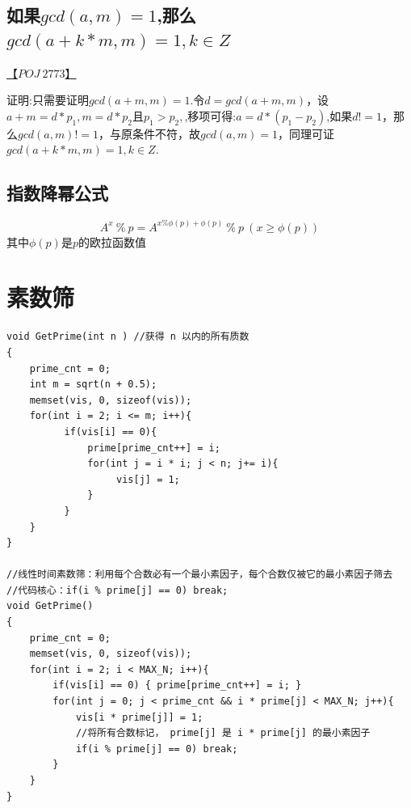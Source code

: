 \subsection{如果$gcd(a,m)=1$,那么$gcd(a+k*m,m)=1,k\in Z$}
\underline{【$POJ\ 2773$】}

证明:只需要证明$gcd(a+m, m)=1$.令$d=gcd(a+m,m)$，设$a+m=d*p_1,m=d*p_2且p_1>p_2,$,移项可得:$a=d*(p_1-p_2)$,如果$d!=1$，那么$gcd(a,m)!=1$，与原条件不符，故$gcd(a,m)=1$，同理可证$gcd(a+k*m,m)=1,k\in Z$.

\subsection{指数降幂公式}
$$A^{x}\ \% \ p=A^{x\%\phi(p)+\phi(p)}\  \% \ p\ (x\geq \phi(p))$$
其中$\phi(p)$是$p$的欧拉函数值

\clearpage
\section{素数筛}

\begin{lstlisting}
void GetPrime(int n ) //获得 n 以内的所有质数
{
    prime_cnt = 0;
    int m = sqrt(n + 0.5);
    memset(vis, 0, sizeof(vis));
    for(int i = 2; i <= m; i++){
          if(vis[i] == 0){
              prime[prime_cnt++] = i;
              for(int j = i * i; j < n; j+= i){
                   vis[j] = 1;
              }
          }
    }
}

//线性时间素数筛：利用每个合数必有一个最小素因子，每个合数仅被它的最小素因子筛去
//代码核心：if(i % prime[j] == 0) break;
void GetPrime()
{
    prime_cnt = 0;
    memset(vis, 0, sizeof(vis));
    for(int i = 2; i < MAX_N; i++){
        if(vis[i] == 0) { prime[prime_cnt++] = i; }
        for(int j = 0; j < prime_cnt && i * prime[j] < MAX_N; j++){
            vis[i * prime[j]] = 1;
            //将所有合数标记， prime[j] 是 i * prime[j] 的最小素因子
            if(i % prime[j] == 0) break;
        }
    }
}
\end{lstlisting}

